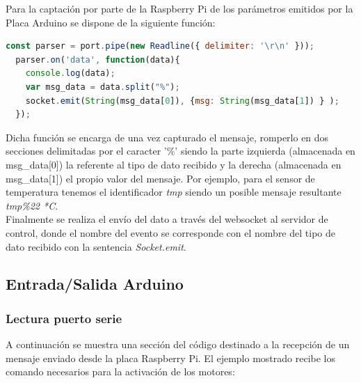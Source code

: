 Para la captación por parte de la Raspberry Pi de los parámetros emitidos por la Placa Arduino se dispone de la siguiente función:\\

\begin{lstlisting}[language=JavaScript]
  const parser = port.pipe(new Readline({ delimiter: '\r\n' }));
  parser.on('data', function(data){
    console.log(data);
    var msg_data = data.split("%");
    socket.emit(String(msg_data[0]), {msg: String(msg_data[1]) } );
  });

\end{lstlisting}

Dicha función se encarga de una vez capturado el mensaje, romperlo en dos secciones delimitadas por el caracter '\%' siendo la parte izquierda (almacenada en msg_data[0]) la referente al tipo de dato recibido
y la derecha (almacenada en msg_data[1]) el propio valor del mensaje. Por ejemplo, para el sensor de temperatura tenemos el identificador \emph{tmp} siendo un posible mensaje
resultante \emph{tmp\%22 *C}.\\

Finalmente se realiza el envío del dato a través del websocket al servidor de control, donde el nombre del evento se corresponde con el nombre del tipo de dato recibido con la sentencia \emph{Socket.emit}.\\

\subsection{Entrada/Salida Arduino}

\subsubsection{Lectura puerto serie}

A continuación se muestra una sección del código destinado a la recepción de un mensaje enviado desde la placa Raspberry Pi. El ejemplo mostrado recibe los comando necesarios para
la activación de los motores:\\

